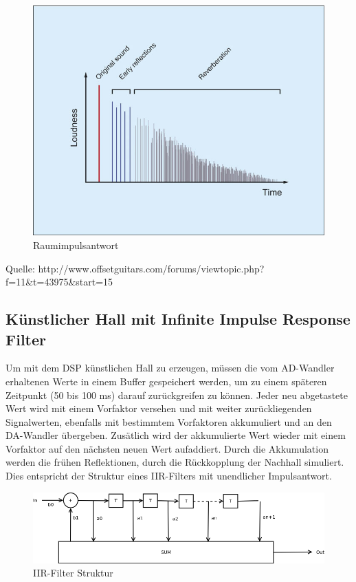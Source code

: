 \documentclass[a4paper,12pt,fontsize=12,DIV=12]{scrartcl}
\begin{document}
\begin{figure}[h]
	\includegraphics[scale=0.5]{Bilder/raumimpulsantwort.jpg}
	\caption{Raumimpulsantwort}
	\label{labelname}
\end{figure}
Quelle: http://www.offsetguitars.com/forums/viewtopic.php?f=11\&t=43975\&start=15

\subsection{Künstlicher Hall mit Infinite Impulse Response Filter}
Um mit dem DSP künstlichen Hall zu erzeugen, müssen die vom AD-Wandler erhaltenen Werte in einem Buffer gespeichert werden, um zu einem späteren Zeitpunkt (50 bis 100 ms) darauf zurückgreifen zu können. Jeder neu abgetastete Wert wird mit einem Vorfaktor versehen und mit weiter zurückliegenden Signalwerten, ebenfalls mit bestimmtem Vorfaktoren akkumuliert und an den DA-Wandler übergeben. Zusätlich wird der akkumulierte Wert wieder mit einem Vorfaktor auf den nächsten neuen Wert aufaddiert. Durch die Akkumulation werden die frühen Reflektionen, durch die Rückkopplung der Nachhall simuliert. 
Dies entspricht der Struktur eines IIR-Filters mit unendlicher Impulsantwort.
\begin{figure}[h]
	\includegraphics[scale=0.5]{Bilder/iir.png}
	\caption{IIR-Filter Struktur}
	\label{labelnameIIR-Filter Struktur}
\end{figure}
\end{document}
